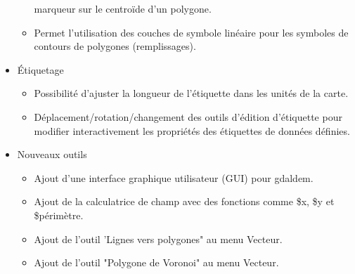 \begin{itemize}[label=--]
\begin{itemize}[label=--]
marqueur sur le centroïde d'un polygone. 
\item Permet l'utilisation des couches de symbole linéaire pour les symboles de 
contours de polygones (remplissages). 
\end{itemize}
\item Étiquetage
\begin{itemize}[label=--]
\item Possibilité d'ajuster la longueur de l'étiquette dans les unités de la carte.
\item Déplacement/rotation/changement des outils d'édition d'étiquette pour modifier 
interactivement les propriétés des étiquettes de données définies.
\end{itemize}
\item Nouveaux outils
\begin{itemize}[label=--]
\item Ajout d'une interface graphique utilisateur (GUI) pour gdaldem. 
\item Ajout de la calculatrice de champ avec des fonctions comme \$x, \$y et \$périmètre. 
\item Ajout de l'outil 'Lignes vers polygones" au menu Vecteur. 
\item Ajout de l'outil "Polygone de Voronoi" au menu Vecteur. 
\end{itemize}
\end{itemize}


